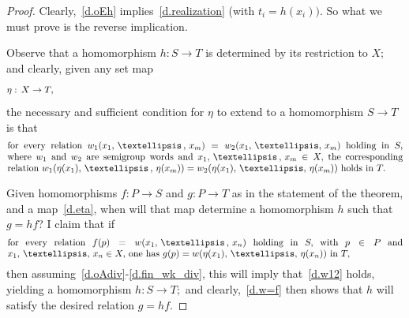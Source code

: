 \documentclass[10pt,a4paper]{amsart}
\begin{document}
\begin{proof}
Clearly,~\eqref{d.oEh} implies~\eqref{d.realization}
(with $t_i=h(x_i)).$
So what we must prove is the reverse implication.

Observe that a homomorphism $h:S\to T$ is determined by
its restriction to $X;$ and clearly, given any set map
%
\begin{equation}\begin{minipage}[c]{35pc}\label{d.eta}
$\eta:\,X\to T,$
\end{minipage}\end{equation}
%
the necessary and sufficient condition for $\eta$ to
extend to a homomorphism $S\to T$ is that
%
\begin{equation}\begin{minipage}[c]{35pc}\label{d.w12}
for every relation
$w_1(x_1,\,\dots\,,\,x_m) = w_2(x_1,\,\dots,\,x_m)$
holding in $S,$ where $w_1$ and $w_2$ are semigroup words
and $x_1,\,\dots\,,\,x_m\in X,$ the corresponding relation
$w_1(\eta(x_1),\,\dots\,,\,\eta(x_m)) =
w_2(\eta(x_1),\,\dots,\,\eta(x_m))$ holds in~$T.$
\end{minipage}\end{equation}

Given homomorphisms $f:P\to S$ and $g:P\to T$ as in
the statement of the theorem, and a map~\eqref{d.eta},
when will that map determine a homomorphism $h$ such that $g=hf$?
I claim that if
%
\begin{equation}\begin{minipage}[c]{35pc}\label{d.w=f}
for every relation $f(p)=w(x_1,\,\dots\,,\,x_n)$
holding in $S,$ with $p\in P$ and $x_1,\,\dots,\,x_n\in X,$ one has
$g(p)=w(\eta(x_1),\,\dots,\,\eta(x_n))$ in $T,$
\end{minipage}\end{equation}
%
then assuming~\eqref{d.oAdiv}-\eqref{d.fin_wk_div},
this will imply that~\eqref{d.w12} holds,
yielding a homomorphism $h:S\to T;$ and clearly,~\eqref{d.w=f}
then shows that $h$ will satisfy the desired relation $g=hf.$


\end{proof}
\end{document}

